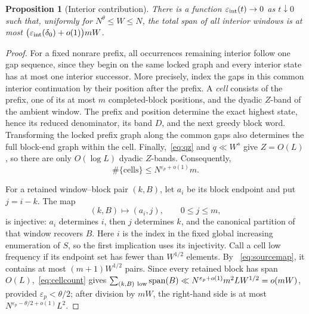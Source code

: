 \documentclass[a4paper,10pt]{amsart}
\newtheorem{proposition}[theorem]{Proposition}
\theoremstyle{remark}
\newcommand{\Span}{\operatorname{span}}
\begin{document}
\begin{proposition}[Interior contribution]\label{prop:interior}
There is a function $\varepsilon_{\rm int}(t)\to0$ as $t\downarrow0$ such
that, uniformly for $N^\theta\le W\le N$, the total span of all interior
windows is at most
$\bigl(\varepsilon_{\rm int}(\delta_0)+o(1)\bigr)mW$.
\end{proposition}

\begin{proof}
For a fixed nonrare prefix, all occurrences remaining interior follow one
gap sequence, since they begin on the same locked graph and every interior
state has at most one interior successor. More precisely, index the gaps in
this common interior continuation by their position after the prefix. A
\emph{cell} consists of the prefix, one of its at most $m$ completed-block
positions, and the dyadic $Z$-band of the ambient window. The prefix and
position determine the exact highest state, hence its reduced denominator,
its band $D$, and the next greedy block word. Transforming the locked prefix
graph along the common gaps also determines the full block-end graph within
the cell. Finally,~\eqref{eq:qz} and $q\ll W^s$ give $Z=O(L)$, so there are
only $O(\log L)$ dyadic $Z$-bands. Consequently,
\begin{equation}\label{eq:cellcount}
 \#\{\text{cells}\}\le N^{\varepsilon_p+o(1)}m.
\end{equation}

For a retained window--block pair $(k,B)$, let $a_i$ be its block endpoint
and put $j=i-k$. The map
\begin{equation}\label{eq:sourcemap}
 (k,B)\longmapsto(a_i,j),\qquad 0\le j\le m,
\end{equation}
is injective: $a_i$ determines $i$, then $j$ determines $k$, and the
canonical partition of that window recovers $B$. Here $i$ is the index in the
fixed global increasing enumeration of $S$, so the first implication uses its
injectivity. Call a cell low frequency
if its endpoint set has fewer than $W^{1/2}$ elements. By
~\eqref{eq:sourcemap}, it contains at most $(m+1)W^{1/2}$ pairs. Since every
retained block has span $O(L)$,~\eqref{eq:cellcount} gives
$\sum_{(k,B)\ {\rm low}}\Span(B)
\ll N^{\varepsilon_p+o(1)}m^2LW^{1/2}=o(mW)$, provided
$\varepsilon_p<\theta/2$; after division by $mW$, the right-hand side is at
most $N^{\varepsilon_p-\theta/2+o(1)}L^2$.


\end{proof}
\end{document}
